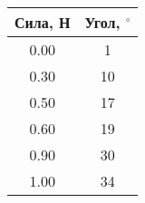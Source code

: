 \begin{tabular}{|c|c|}
\hline
Сила, Н & Угол, $^\circ$ \\ \hline
0.00 & 1 \\ \hline
0.30 & 10 \\ \hline
0.50 & 17 \\ \hline
0.60 & 19 \\ \hline
0.90 & 30 \\ \hline
1.00 & 34 \\ \hline
\end{tabular}
